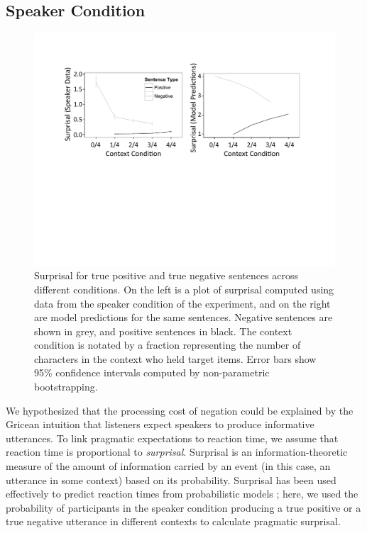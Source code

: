 \documentclass[man, noapacite]{apa2}
\begin{document}
\subsection{Speaker Condition}

\begin{figure}[t]
\begin{center} 
\includegraphics[width=6in]{figures/surprisals.pdf}
\caption{\label{fig:e2line} Surprisal for true positive and true negative sentences across different conditions. On the left is a plot of surprisal computed using data from the speaker condition of the experiment, and on the right are model predictions for the same sentences.  Negative sentences are shown in grey, and positive sentences in black.  The context condition is notated by a fraction representing the number of characters in the context who held target items. Error bars show 95\% confidence intervals computed by non-parametric bootstrapping.  }
\end{center} 
\end{figure}

We hypothesized that the processing cost of negation could be explained by the Gricean intuition that listeners expect speakers to produce informative utterances.  To link pragmatic expectations to reaction time, we assume that reaction time is proportional to \emph{surprisal}. Surprisal is an information-theoretic measure of the amount of information carried by an event (in this case, an utterance in some context) based on its probability. Surprisal has been used effectively to predict reaction times from probabilistic models \cite{levy2008}; here, we used the probability of participants in the speaker condition producing a true positive or a true negative utterance in different contexts to calculate pragmatic surprisal.
\end{document}
